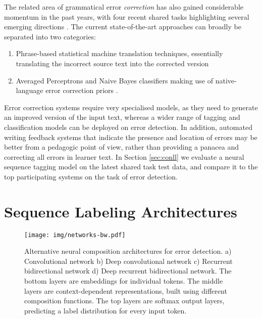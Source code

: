\documentclass[11pt]{article}
\begin{document}
The related area of grammatical error \textit{correction} has also gained considerable momentum in the past years, with four recent shared tasks highlighting several emerging directions \cite{Dale2011,Dale2012,Ng2013,Ng2013a}. 
The current state-of-the-art approaches can broadly be separated into two categories:

\begin{enumerate}
\item Phrase-based statistical machine translation techniques, essentially translating the incorrect source text into the corrected version \cite{Felice2014,Junczys-Dowmunt2014}
\item Averaged Perceptrons and Naive Bayes classifiers making use of native-language error correction priors \cite{Rozovskaya2014,Rozovskaya2013}.
\end{enumerate}

\noindent Error correction systems require very specialised models, as they need to generate an improved version of the input text, whereas a wider range of tagging and classification models can be deployed on error detection.
In addition, automated writing feedback systems that indicate the presence and location of errors may be better from a pedagogic point of view, rather than providing a panacea and correcting all errors in learner text.
In Section \ref{sec:conll} we evaluate a neural sequence tagging model on the latest shared task test data, and compare it to the top participating systems on the task of error detection.






\section{Sequence Labeling Architectures}

\begin{figure*}[t]
	\texttt{[image: img/networks-bw.pdf]}
	\caption{Alternative neural composition architectures for error detection. a) Convolutional network b) Deep convolutional network c) Recurrent bidirectional network d) Deep recurrent bidirectional network. The bottom layers are embeddings for individual tokens. The middle layers are context-dependent representations, built using different composition functions. The top layers are softmax output layers, predicting a label distribution for every input token.}
	\label{fig:networks}
\end{figure*}
\end{document}
